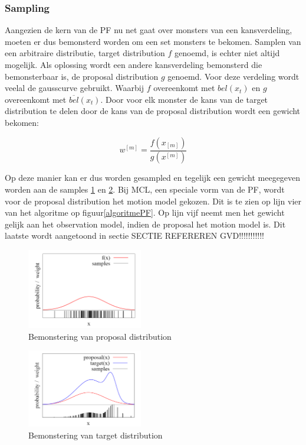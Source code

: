 \documentclass{book}
\begin{document}
\subsubsection{Sampling}
\label{sampling}
Aangezien de kern van de PF nu net gaat over monsters van een kansverdeling, moeten er dus bemonsterd worden om een set monsters te bekomen. Samplen van een arbitraire distributie, target distribution $f$ genoemd, is echter niet altijd mogelijk. Als oplossing wordt een andere kansverdeling bemonsterd die bemonsterbaar is, de proposal distribution $g$ genoemd. Voor deze verdeling wordt veelal de gausscurve gebruikt. Waarbij $f$ overeenkomt met $bel(x_{t})$ en $g$ overeenkomt met $\overline{bel}(x_{t})$. Door voor elk monster de kans van de target distribution te delen door de kans van de proposal distribution wordt een gewicht bekomen:

\begin{equation}
w^{[m]}=\dfrac{f(x_{[m]})}{g(x^{[m]})}
\label{gewicht}
\end{equation}

Op deze manier kan er dus worden gesampled en tegelijk een gewicht meegegeven worden aan de samples \ref{samples1} en \ref{samples2}.
Bij MCL, een speciale vorm van de PF, wordt voor de proposal distribution het motion model gekozen. Dit is te zien op lijn vier van het algoritme op figuur\ref{algoritmePF}. Op lijn vijf neemt men het gewicht gelijk aan het observation model, indien de proposal het motion model is. Dit laatste wordt aangetoond in sectie SECTIE REFEREREN GVD!!!!!!!!!!!




\begin{multicols}{2}
	\begin{figure}[H]
	\centering
	\includegraphics[width = 0.45\textwidth]{samples.png}
	\caption{Bemonstering van proposal distribution}
	\label{samples1}
	\end{figure}
	
	\begin{figure}[H]
	\centering
	\includegraphics[width = 0.45\textwidth]{samples2.png}
	\caption{Bemonstering van target distribution}
	\label{samples2}
	\end{figure}
\end{multicols}
\end{document}

